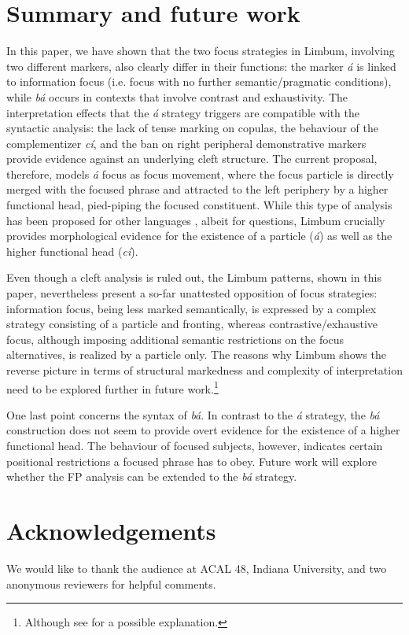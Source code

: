 \documentclass[output=paper,
modfonts
]{langscibook}
\begin{document}
\section{Summary and future work}\largerpage
In this paper, we have shown that the two focus strategies in Limbum, involving two different markers, also clearly differ in their functions: the marker \textit{á} is linked to information focus (i.e. focus with no further semantic/pragmatic conditions), while \textit{bá} occurs in contexts that involve contrast and exhaustivity. The interpretation effects that the {\em \'a} strategy triggers are compatible with the syntactic analysis: the lack of tense marking on copulas, the behaviour of the complementizer \textit{cí}, and the ban on right peripheral demonstrative markers provide evidence against an underlying cleft structure. The current proposal, therefore, models {\em\'a} focus as focus movement, where the focus particle is directly merged with the focused phrase and attracted to the left periphery by a higher functional head, pied-piping the focused constituent. While this type of analysis has been proposed for other languages \citep{Hagstrom1998,Cable2010}, albeit for questions, Limbum crucially provides morphological evidence for the existence of a particle (\textit{\'a}) as well as the higher functional head (\textit{c\'i}).

Even though a cleft analysis is ruled out, the Limbum patterns, shown in this paper, nevertheless present a so-far unattested opposition of focus strategies: information focus, being less marked semantically, is expressed by a complex strategy consisting of a particle and fronting, whereas contrastive/exhaustive focus, although imposing additional semantic restrictions on the focus alternatives, is realized by a particle only. The reasons why Limbum shows the reverse picture in terms of structural markedness and complexity of interpretation need to be explored further in future work.\footnote{Although see \citet{Driemeletal2018} for a possible explanation.}

One last point concerns the syntax of {\em b\'a}. In contrast to the {\em \'a} strategy, the {\em b\'a} construction does not seem to provide overt evidence for the existence of a higher functional head. The behaviour of focused subjects, however, indicates certain positional restrictions a focused phrase has to obey. Future work will explore whether the FP analysis can be extended to the {\em b\'a} strategy.

\section*{Acknowledgements}
We would like to thank the audience at ACAL 48, Indiana University, and two anonymous reviewers for helpful comments.
\end{document}
